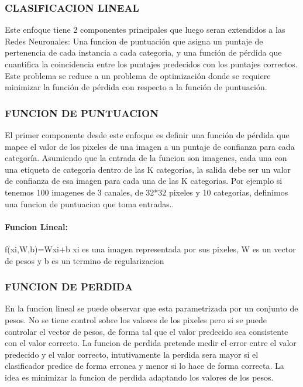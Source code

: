 \documentclass[a4paper,10pt]{article}
\begin{document}
  \subsubsection{CLASIFICACION LINEAL}
    Este enfoque tiene 2 componentes principales que luego seran extendidos a las Redes Neuronales: Una funcion de puntuación que asigna un puntaje de pertenencia de cada instancia a cada categoria, 
    y una función de pérdida que cuantifica la coincidencia entre los puntajes predecidos con los puntajes correctos.
    Este problema se reduce a un problema de optimización donde se requiere minimizar la función de pérdida con respecto a la función de puntuación.

  \subsubsection{FUNCION DE PUNTUACION}
    El primer componente desde este enfoque es definir una función de pérdida que mapee el valor de los pixeles de una imagen a un puntaje de confianza para cada categoría.
    Asumiendo que la entrada de la funcion son imagenes, cada una con una etiqueta de categoria dentro de las K categorias, la salida debe ser un valor de confianza de esa imagen 
    para cada una de las K categorias.
    Por ejemplo si tenemos 100 imagenes de 3 canales, de 32*32 pixeles y 10 categorias, definimos una funcion de puntuacion que toma entradas..

      \paragraph{Funcion Lineal:} 
	f(xi,W,b)=Wxi+b
	xi es una imagen representada por sus pixeles, W es un vector de pesos y b es un termino de regularizacion

    \subsubsection{FUNCION DE PERDIDA}
      En la funcion lineal se puede observar que esta parametrizada por un conjunto de pesos.
      No se tiene control sobre los valores de los pixeles pero si se puede controlar el vector de pesos, de forma tal que el valor predecido sea consistente con el valor correcto. 
      La funcion de perdida pretende medir el error entre el valor predecido y el valor correcto, intutivamente la perdida sera mayor si el clasificador predice de forma erronea y 
      menor si lo hace de forma correcta.
      La idea es minimizar la funcion de perdida adaptando los valores de los pesos.
\end{document}
